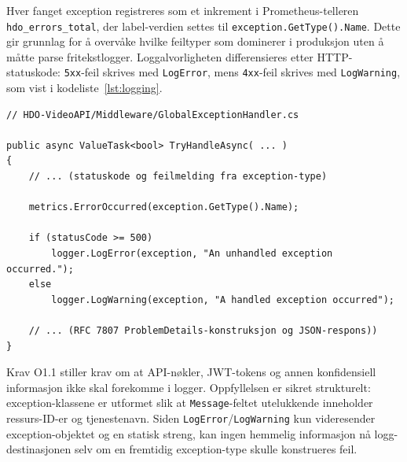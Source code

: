 
Hver fanget exception registreres som et inkrement i
Prometheus-telleren \texttt{hdo\_errors\_total}, der label-verdien
settes til \texttt{exception.GetType().Name}. Dette gir grunnlag for
å overvåke hvilke feiltyper som dominerer i produksjon uten å måtte
parse fritekstlogger. Loggalvorligheten differensieres etter
HTTP-statuskode: \texttt{5xx}-feil skrives med \texttt{LogError},
mens \texttt{4xx}-feil skrives med \texttt{LogWarning}, som vist i kodeliste~\ref{lst:logging}.

\begin{lstlisting}[language={[Sharp]C}, caption={Differensiert logging i \texttt{GlobalExceptionHandler}.}, label={lst:logging}]
// HDO-VideoAPI/Middleware/GlobalExceptionHandler.cs

public async ValueTask<bool> TryHandleAsync( ... )
{
    // ... (statuskode og feilmelding fra exception-type)
    
    metrics.ErrorOccurred(exception.GetType().Name);
    
    if (statusCode >= 500)
        logger.LogError(exception, "An unhandled exception occurred.");
    else
        logger.LogWarning(exception, "A handled exception occurred");

    // ... (RFC 7807 ProblemDetails-konstruksjon og JSON-respons))
}
\end{lstlisting}


Krav O1.1 \cite{hdo_kravspec} stiller krav om at API-nøkler, JWT-tokens
og annen konfidensiell informasjon ikke skal forekomme i logger.
Oppfyllelsen er sikret strukturelt: exception-klassene er utformet slik
at \texttt{Message}-feltet utelukkende inneholder ressurs-ID-er og
tjenestenavn. Siden \texttt{LogError}/\texttt{LogWarning} kun
videresender exception-objektet og en statisk streng, kan ingen
hemmelig informasjon nå logg-destinasjonen selv om en fremtidig
exception-type skulle konstrueres feil.

